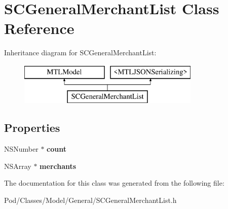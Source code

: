 \hypertarget{interface_s_c_general_merchant_list}{}\section{S\+C\+General\+Merchant\+List Class Reference}
\label{interface_s_c_general_merchant_list}
Inheritance diagram for S\+C\+General\+Merchant\+List\+:\begin{figure}[H]
\begin{center}
\leavevmode
\includegraphics[height=2.000000cm]{interface_s_c_general_merchant_list}
\end{center}
\end{figure}
\subsection*{Properties}
\begin{DoxyCompactItemize}
\item 
N\+S\+Number $\ast$ {\bfseries count}\hypertarget{interface_s_c_general_merchant_list_a947346ff1eefa7d593dd2ddbff866689}{}\label{interface_s_c_general_merchant_list_a947346ff1eefa7d593dd2ddbff866689}

\item 
N\+S\+Array $\ast$ {\bfseries merchants}\hypertarget{interface_s_c_general_merchant_list_a9666d066bde14df4f3d9b505215164b2}{}\label{interface_s_c_general_merchant_list_a9666d066bde14df4f3d9b505215164b2}

\end{DoxyCompactItemize}


The documentation for this class was generated from the following file\+:\begin{DoxyCompactItemize}
\item 
Pod/\+Classes/\+Model/\+General/S\+C\+General\+Merchant\+List.\+h\end{DoxyCompactItemize}
